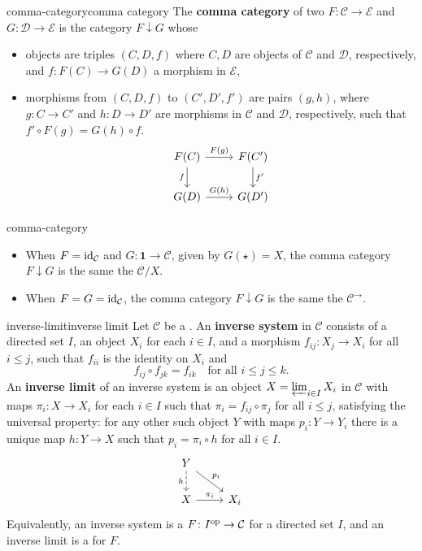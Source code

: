 \begin{topic}{comma-category}{comma category}
    The \textbf{comma category} of two  $F \colon \mathcal{C} \to \mathcal{E}$ and $G \colon \mathcal{D} \to \mathcal{E}$ is the category $F \downarrow G$ whose
    \begin{itemize}
        \item objects are triples $(C, D, f)$ where $C, D$ are objects of $\mathcal{C}$ and $\mathcal{D}$, respectively, and $f \colon F(C) \to G(D)$ a morphism in $\mathcal{E}$,
        \item morphisms from $(C, D, f)$ to $(C', D', f')$ are pairs $(g, h)$, where $g \colon C \to C'$ and $h \colon D \to D'$ are morphisms in $\mathcal{C}$ and $\mathcal{D}$, respectively, such that $f' \circ F(g) = G(h) \circ f$.
        \[ \svg \begin{tikzcd}
            F(C) \arrow{r}{F(g)} \arrow[swap]{d}{f} & F(C') \arrow{d}{f'} \\ G(D) \arrow{r}{G(h)} & G(D')
        \end{tikzcd} \]
    \end{itemize}
\end{topic}

\begin{example}{comma-category}
    \begin{itemize}
        \item When $F = \textup{id}_\mathcal{C}$ and $G \colon \textbf{1} \to \mathcal{C}$, given by $G(\star) = X$, the comma category $F \downarrow G$ is the same the  $\mathcal{C}/X$.
        \item When $F = G = \textup{id}_\mathcal{C}$, the comma category $F \downarrow G$ is the same the  $\mathcal{C}^\rightarrow$.
    \end{itemize}
\end{example}

\begin{topic}{inverse-limit}{inverse limit}
    Let $\mathcal{C}$ be a . An \textbf{inverse system} in $\mathcal{C}$ consists of a directed set $I$, an object $X_i$ for each $i \in I$, and a morphism $f_{ij} \colon X_j \to X_i$ for all $i \le j$, such that $f_{ii}$ is the identity on $X_i$ and
    \[ f_{ij} \circ f_{jk} = f_{ik} \quad \text{for all } i \le j \le k . \]
    An \textbf{inverse limit} of an inverse system is an object $X = \varprojlim_{i \in I} X_i$ in $\mathcal{C}$ with maps $\pi_i \colon X \to X_i$ for each $i \in I$ such that $\pi_i = f_{ij} \circ \pi_j$ for all $i \le j$, satisfying the universal property: for any other such object $Y$ with maps $p_i \colon Y \to Y_i$ there is a unique map $h \colon Y \to X$ such that $p_i = \pi_i \circ h$ for all $i \in I$.
    \[ \svg \begin{tikzcd} Y \arrow[dashed, swap]{d}{h} \arrow{dr}{p_i} & \\ X \arrow{r}{\pi_i} & X_i \end{tikzcd} \]
    Equivalently, an inverse system is a  $F \colon I^\textup{op} \to \mathcal{C}$ for a directed set $I$, and an inverse limit is a  for $F$.
\end{topic}

